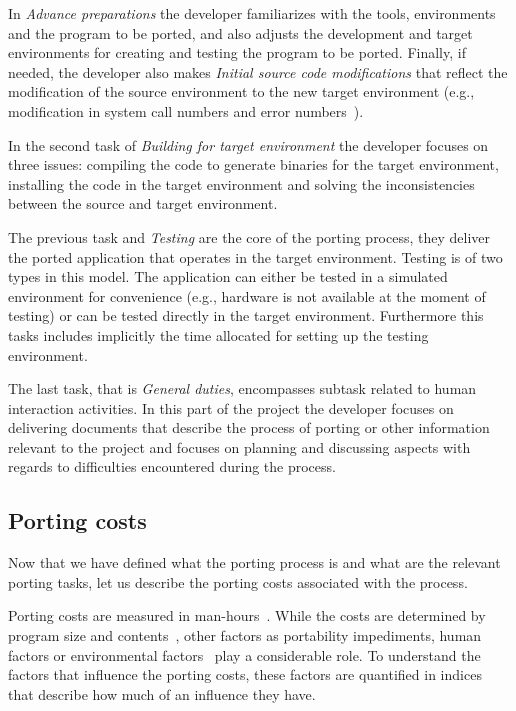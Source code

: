 In \textit{Advance preparations} the developer familiarizes with the tools,
environments and the program to be ported, and also adjusts the development and
target environments for creating and testing the program to be ported. Finally,
if needed, the developer also makes \textit{Initial source code modifications}
that reflect the modification of the source environment to the new target
environment (e.g., modification in system call numbers and error
numbers~\cite{callahanopenbsd}).

In the second task of \textit{Building for target environment} the developer
focuses on three issues: compiling the code to generate binaries for the
target environment, installing the code in the target environment and solving
the inconsistencies between the source and target environment.

The previous task and \textit{Testing} are the core of the porting process, they
deliver the ported application that operates in the target environment.
Testing is of two types in this model. The application can either be tested in a
simulated environment for convenience (e.g., hardware is not available at the
moment of testing) or can be tested directly in the target environment.
Furthermore this tasks includes implicitly the time allocated for setting up the
testing environment.

The last task, that is \textit{General duties}, encompasses subtask related to
human interaction activities. In this part of the project the developer focuses
on delivering documents that describe the process of porting or other
information relevant to the project and focuses on planning and discussing
aspects with regards to difficulties encountered during the process.

\subsection{Porting costs}

Now that we have defined what the porting process is and what are the relevant
porting tasks, let us describe the porting costs associated with the process.

Porting costs are measured in man-hours~\cite{tanaka, hakuta}. While the costs are
determined by program size and contents~\cite{hakuta}, other factors as portability
impediments, human factors or environmental factors~\cite{hakuta} play a
considerable role. To understand the factors that influence the porting costs,
these factors are quantified in indices that describe how much of an influence
they have.

